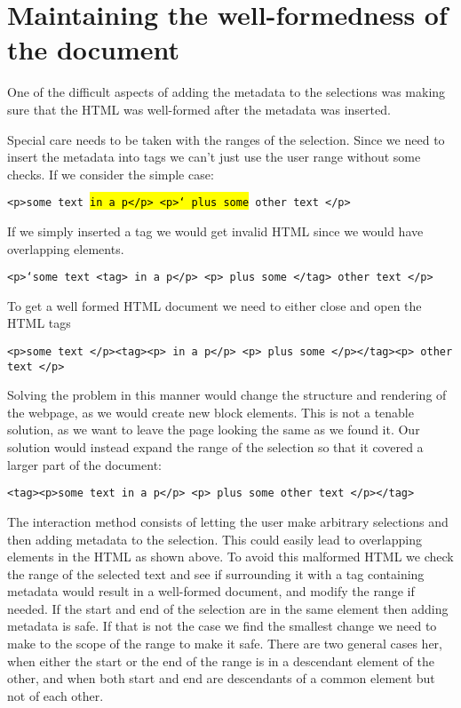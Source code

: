 
\section{Maintaining the well-formedness of the document}
One of the difficult aspects of adding the metadata to the selections was making sure that the HTML was well-formed
after the metadata was inserted.

Special care needs to be taken with the ranges of the selection.
Since we need to insert the metadata into tags we can't just use the user range without some checks.
If we consider the simple case:

\texttt{<p>some text \hl{in a p</p> <p>` plus some} other text </p>}

If we simply inserted a tag we would get invalid HTML since we would have overlapping elements.

\texttt{<p>`some text <tag> in a p</p> <p> plus some </tag>  other text </p>}

To get a well formed HTML document we need to either close and open the HTML tags

\texttt{<p>some text </p><tag><p> in a p</p> <p> plus some </p></tag><p>  other text </p>}

Solving the problem in this manner would change the structure and rendering of the webpage,
as we would create new block elements.
This is not a tenable solution, as we want to leave the page looking the same as we found it.
Our solution would instead expand the range of the selection so that it covered a larger part of the document:

\texttt{<tag><p>some text in a p</p> <p> plus some other text </p></tag>}

The interaction method consists of letting the user make arbitrary selections and then adding metadata to the selection.
This could easily lead to overlapping elements in the HTML as shown above.
To avoid this malformed HTML we check the range of the selected text and see if surrounding it with a tag
containing metadata would result in a well-formed document, and modify the range if needed.
If the start and end of the selection are in the same element then adding metadata is safe.
If that is not the case we find the smallest change we need to make to the scope of the range to make it safe.
There are two general cases her, when either the start or the end of the range is in a descendant element of the other,
and when both start and end are descendants of a common element but not of each other.

